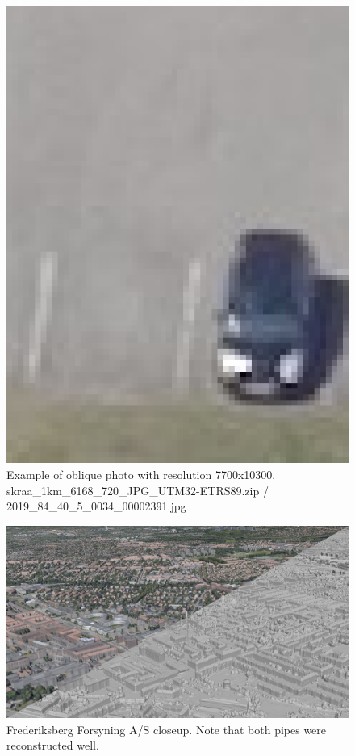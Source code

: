 \documentclass[10pt,letterpaper]{article}
\begin{document}
\begin{figure}
\begin{minipage}[b]{0.32\linewidth}
        \includegraphics[width=\textwidth]{images/copenhagen/figures/2019_84_40_5_0034_00002391_closeup2.jpg}
    \end{minipage}
    \caption{Example of oblique photo with resolution 7700x10300. skraa\_1km\_6168\_720\_JPG\_UTM32-ETRS89.zip / 2019\_84\_40\_5\_0034\_00002391.jpg}
    \label{fig:oblique_photo}
\end{figure}

\begin{figure}
    \centering
    \capstart
    \begin{minipage}[b]{1.0\linewidth}
        \includegraphics[width=\textwidth]{images/copenhagen/results/closeups/diag/frederiksberg_forsyning_as_diag.jpg}
    \end{minipage}
    \caption{Frederiksberg Forsyning A/S closeup. Note that both pipes were reconstructed well.}
    \label{fig:closeup_frederiksberg}
\end{figure}
\end{document}
